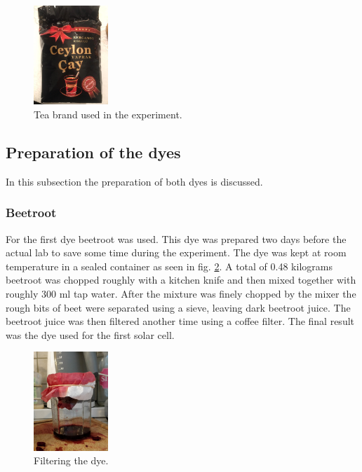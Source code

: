 \documentclass[conference]{IEEEtran}
\begin{document}
\begin{figure}[h]
\centering
\includegraphics[width=0.25\textwidth]{img/cay.png}
\caption{Tea brand used in the experiment.}
\label{fig:cay} %
\end{figure}

\subsection{Preparation of the dyes}
In this subsection the preparation of both dyes is discussed.\\
\subsubsection{Beetroot}
For the first dye beetroot was used. This dye was prepared two days before the actual lab to save some time during the experiment. The dye was kept at room temperature in a sealed container as seen in fig. \ref{fig:dyepreparationbeet}. A total of 0.48 kilograms beetroot was chopped roughly with a kitchen knife and then mixed together with roughly 300 ml tap water. After the mixture was finely chopped by the mixer the rough bits of beet were separated using a sieve, leaving dark beetroot juice. The beetroot juice was then filtered another time using a coffee filter. The final result was the dye used for the first solar cell.

\begin{figure}[h]
\centering
\includegraphics[width=0.25\textwidth]{img/DyePreparationBeet.jpg}
\caption{Filtering the dye.}
\label{fig:dyepreparationbeet} %
\end{figure}
\end{document}
